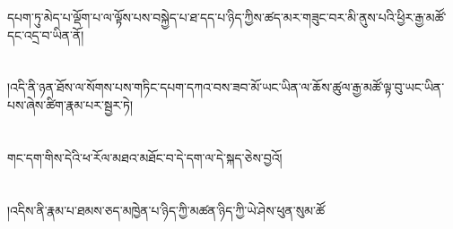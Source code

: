 དཔག་ཏུ་མེད་པ་ལྡོག་པ་ལ་ལྟོས་པས་བསྐྱེད་པ་ཐ་དད་པ་ཉིད་ཀྱིས་ཚད་མར་གཟུང་བར་མི་ནུས་པའི་ཕྱིར་རྒྱ་མཚོ་དང་འདྲ་བ་ཡིན་ནོ།\chapter{ }།འདི་ནི་ཉན་ཐོས་ལ་སོགས་པས་གཏིང་དཔག་དཀའ་བས་ཟབ་མོ་ཡང་ཡིན་ལ་ཆོས་ཚུལ་རྒྱ་མཚོ་ལྟ་བུ་ཡང་ཡིན་པས་ཞེས་ཚིག་རྣམ་པར་སྦྱར་ཏེ།\chapter{ }གང་དག་གིས་དེའི་ཕ་རོལ་མཐའ་མཐོང་བ་དེ་དག་ལ་དེ་སྐད་ཅེས་བྱའོ།\chapter{ }།འདིས་ནི་རྣམ་པ་ཐམས་ཅད་མཁྱེན་པ་ཉིད་ཀྱི་མཚན་ཉིད་ཀྱི་ཡེ་ཤེས་ཕུན་སུམ་ཚོ